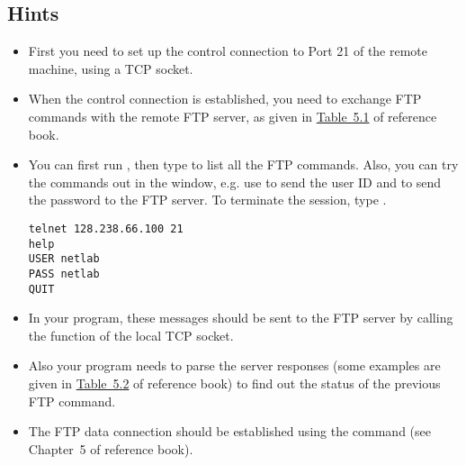 \documentclass{../UTNetLab}
\begin{document}
\subsection*{Hints}
\begin{itemize}
    \item First you need to set up the control connection to Port 21 of the remote machine, using a TCP socket.
    \item When the control connection is established, you need to exchange FTP commands with the remote FTP server, as given in \hyperref[tab:5.1]{Table~5.1} of reference book.
    \item You can first run , then type  to list all the FTP commands.
          Also, you can try the commands out in the  window, e.g. use  to send the user ID and  to send the password to the FTP server.
          To terminate the  session, type .
          
          \begin{lstlisting}
telnet 128.238.66.100 21
help
USER netlab
PASS netlab
QUIT
          \end{lstlisting}
    \item In your program, these messages should be sent to the FTP server by calling the  function of the local TCP socket.
    \item Also your program needs to parse the server responses (some examples are given in \hyperref[tab:5.2]{Table~5.2} of reference book) to find out the status of the previous FTP command.
    \item The FTP data connection should be established using the  command (see Chapter~5 of reference book).
\end{itemize}
\end{document}
